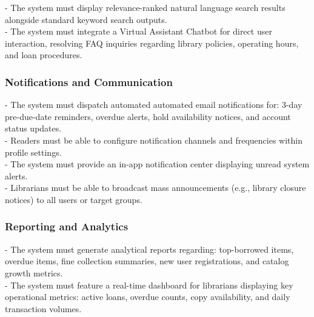 - The system must display relevance-ranked natural language search results alongside standard keyword search outputs.\\

- The system must integrate a Virtual Assistant Chatbot for direct user interaction, resolving FAQ inquiries regarding library policies, operating hours, and loan procedures.\\







\subsubsection{Notifications and Communication}

- The system must dispatch automated automated email notifications for: 3-day pre-due-date reminders, overdue alerts, hold availability notices, and account status updates.\\

- Readers must be able to configure notification channels and frequencies within profile settings.\\

- The system must provide an in-app notification center displaying unread system alerts.\\

- Librarians must be able to broadcast mass announcements (e.g., library closure notices) to all users or target groups.\\



\subsubsection{Reporting and Analytics}

- The system must generate analytical reports regarding: top-borrowed items, overdue items, fine collection summaries, new user registrations, and catalog growth metrics.\\

- The system must feature a real-time dashboard for librarians displaying key operational metrics: active loans, overdue counts, copy availability, and daily transaction volumes.\\

